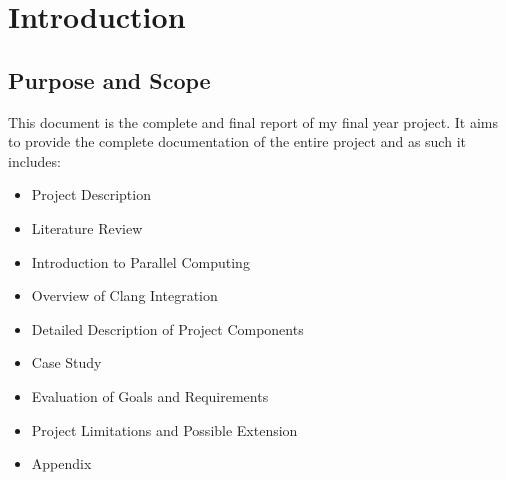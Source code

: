 
\section{Introduction} %



\subsection{Purpose and Scope} %

This document is the complete and final report of my final year project. It aims to provide the
complete documentation of the entire project and as such it includes:

\begin{itemize} 
    \item Project Description
    \item Literature Review
    \item Introduction to Parallel Computing
    \item Overview of Clang Integration
    \item Detailed Description of Project Components
    \item Case Study
    \item Evaluation of Goals and Requirements
    \item Project Limitations and Possible Extension
    \item Appendix
\end{itemize}
